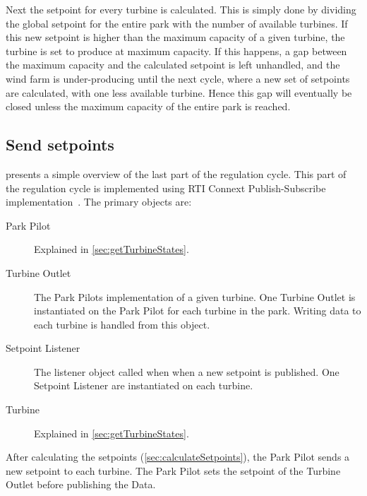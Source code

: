 Next the setpoint for every turbine is calculated. This is simply done by dividing the global setpoint for the entire park with the number of available turbines. If this new setpoint is higher than the maximum capacity of a given turbine, the turbine is set to produce at maximum capacity. If this happens, a gap between the maximum capacity and the calculated setpoint is left unhandled, and the wind farm is under-producing until the next cycle, where a new set of setpoints are calculated, with one less available turbine. Hence this gap will eventually be closed unless the maximum capacity of the entire park is reached.

\subsection{Send setpoints}

 presents a simple overview of the last part of the regulation cycle. This part of the regulation cycle is implemented using RTI Connext Publish-Subscribe implementation~\cite{rtiConnextUsersManual}. The primary objects are:

\begin{description}
	\item [Park Pilot] Explained in \cref{sec:getTurbineStates}.
	\item [Turbine Outlet] The Park Pilots implementation of a given turbine. One Turbine Outlet is instantiated on the Park Pilot for each turbine in the park. Writing data to each turbine is handled from this object.
	\item [Setpoint Listener] The listener object called when when a new setpoint is published. One Setpoint Listener are instantiated on each turbine.
	\item [Turbine] Explained in \cref{sec:getTurbineStates}.
\end{description}

After calculating the setpoints (\cref{sec:calculateSetpoints}), the Park Pilot sends a new setpoint to each turbine. The Park Pilot sets the setpoint of the Turbine Outlet before publishing the Data.

